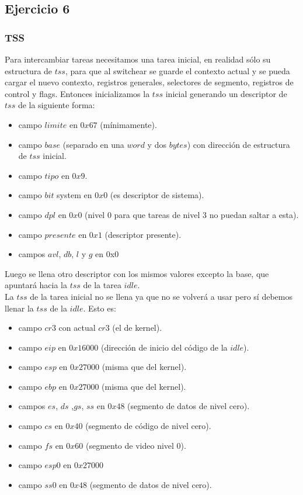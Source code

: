 \subsection{Ejercicio 6}

\subsubsection{TSS}
Para intercambiar tareas necesitamos una tarea inicial, en realidad sólo su estructura de $tss$, para que al switchear se guarde el contexto actual y se pueda cargar el nuevo contexto, registros generales, selectores
 de segmento, registros de control y flags. Entonces inicializamos la $tss$ inicial generando un descriptor 
de $tss$ de la siguiente forma:
\begin{itemize}
\item campo $limite$ en $0x67$ (mínimamente).
\item campo $base$ (separado en una $word$ y dos $bytes$) con dirección de estructura de $tss$ inicial.
\item campo $tipo$ en $0x9$.
\item campo $bit$ system en $0x0$ (es descriptor de sistema).
\item campo $dpl$ en $0x0$ (nivel 0 para que tareas de nivel 3 no puedan saltar a esta).
\item campo $presente$ en $0x1$ (descriptor presente).
\item campos $avl$, $db$, $l$ y $g$ en 0x0
\end{itemize}

Luego se llena otro descriptor con los mismos valores excepto la base, que apuntará hacia la $tss$ de
la tarea $idle$.\\
La $tss$ de la tarea inicial no se llena ya que no se volverá a usar pero sí debemos llenar la $tss$ de la $idle$.
Esto es:
\begin{itemize}
\item campo $cr3$ con actual $cr3$ (el de kernel).
\item campo $eip$ en $0x16000$ (dirección de inicio del código de la $idle$).
\item campo $esp$ en $0x27000$ (misma que del kernel).  
\item campo $ebp$ en $0x27000$ (misma que del kernel).  
\item campos $es$, $ds$ ,$gs$, $ss$ en $0x48$ (segmento de datos de nivel cero).
\item campo $cs$ en $0x40$ (segmento de código de nivel cero).
\item campo $fs$ en $0x60$ (segmento de video nivel 0).
\item campo $esp0$ en $0x27000$ 
\item campo $ss0$ en $0x48$ (segmento de datos de nivel cero).
\end{itemize}

